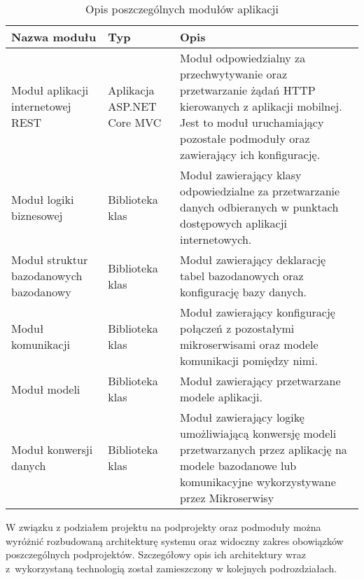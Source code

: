 {\begin{table}[htbp]
	\caption{Opis poszczególnych modułów aplikacji}
	\label{project-architecture}
	\begin{center}
		\begin{tabular}{ | p{3cm}| p{3cm} | p{6cm} |}
			\hline Nazwa modułu & Typ &  Opis \\ \hline   
			
			\hline  Moduł aplikacji internetowej REST &  Aplikacja ASP.NET Core MVC & Moduł odpowiedzialny za przechwytywanie oraz przetwarzanie żądań HTTP kierowanych z aplikacji mobilnej. Jest to moduł uruchamiający pozostałe podmoduły oraz zawierający ich konfigurację.\\ \hline
			
			\hline  Moduł logiki biznesowej & Biblioteka klas & Moduł zawierający klasy odpowiedzialne za przetwarzanie danych odbieranych w punktach dostępowych aplikacji internetowych. \\ \hline
			
			\hline Moduł struktur bazodanowych \mbox{bazodanowy} & Biblioteka klas & Moduł zawierający deklarację tabel bazodanowych oraz konfigurację bazy danych.\\ \hline
			
			\hline Moduł komunikacji & Biblioteka klas & Moduł zawierający konfigurację połączeń z pozostałymi mikroserwisami oraz modele komunikacji pomiędzy nimi.\\ \hline
			
			\hline Moduł modeli & Biblioteka klas & Moduł zawierający przetwarzane modele aplikacji.\\ \hline
			
			
			\hline Moduł konwersji danych & Biblioteka klas & Moduł zawierający logikę umożliwiającą konwersję modeli przetwarzanych przez aplikację na modele bazodanowe lub komunikacyjne wykorzystywane przez Mikroserwisy\\ \hline

		\end{tabular}
	\end{center}
\end{table}	

W związku z podziałem projektu na podprojekty oraz podmoduły można wyróżnić rozbudowaną architekturę systemu oraz widoczny zakres obowiązków poszczególnych podprojektów. Szczegółowy opis ich architektury wraz z~wykorzystaną technologią został zamieszczony w kolejnych podrozdziałach.}


